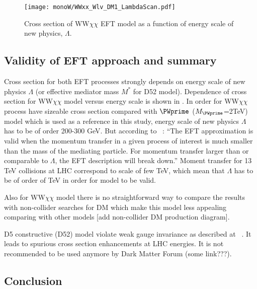\begin{figure}[hb]
 \texttt{[image: monoW/WWxx\_Wlv\_DM1\_LambdaScan.pdf]}
  \caption{Cross section of WW$\chi\chi$ EFT model as a function of energy scale of new physics, $\Lambda$.}
  \label{fig:lambdaScan}
\end{figure}

\subsection{Validity of EFT approach and summary}

Cross section for both EFT processes strongly depends on energy scale of new physics $\Lambda$ (or effective mediator mass $M^{*}$ for D52 model).
Dependence of cross section for WW$\chi\chi$ model versus energy scale is shown in .
In order for WW$\chi\chi$ process have sizeable cross section compared with $\PWprime$ ($M_{\PWprime}$=2TeV) model which is used as a reference in this study, 
energy scale of new physics $\Lambda$ has to be of order 200-300 GeV. But according to ~\cite{arXiv:1512.00476}: 
``The EFT approximation is valid when the momentum transfer in a given
process of interest is much smaller than the mass of the mediating
particle. For momentum transfer larger than or comparable to
$\Lambda$, the EFT description will break down.''
Moment transfer for 13 TeV collisions at LHC correspond to scale of few TeV, 
which mean that $\Lambda$ has to be of order of TeV in order for model to be valid.

Also for WW$\chi\chi$ model there is no straightforward way to compare the
results with non-collider searches for DM
which make this model less appealing comparing with other models [add non-collider DM production diagram].

D5 constructive (D52) model violate weak gauge invariance as described at ~\cite{arXiv:1503.07874}.
It leads to spurious cross section enhancements at LHC energies. It is not recommended to be used anymore by Dark Matter Forum (some link???).

\subsection{Conclusion}

